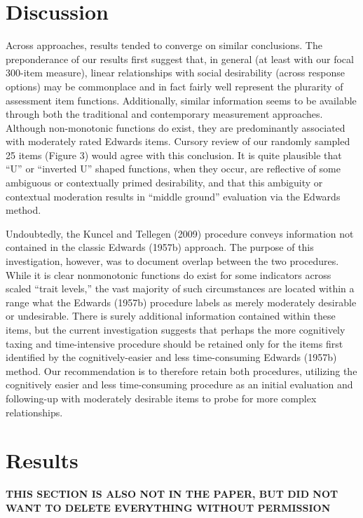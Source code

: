 \documentclass[
  english,
  ,jou]{apa6}
\begin{document}
\hypertarget{discussion}{%
\section{Discussion}\label{discussion}}

Across approaches, results tended to converge on similar conclusions. The preponderance of our results first suggest that, in general (at least with our focal 300-item measure), linear relationships with social desirability (across response options) may be commonplace and in fact fairly well represent the plurarity of assessment item functions. Additionally, similar information seems to be available through both the traditional and contemporary measurement approaches. Although non-monotonic functions do exist, they are predominantly associated with moderately rated Edwards items. Cursory review of our randomly sampled 25 items (Figure 3) would agree with this conclusion. It is quite plausible that ``U'' or ``inverted U'' shaped functions, when they occur, are reflective of some ambiguous or contextually primed desirability, and that this ambiguity or contextual moderation results in ``middle ground'' evaluation via the Edwards method.

Undoubtedly, the Kuncel and Tellegen (2009) procedure conveys information not contained in the classic Edwards (1957b) approach. The purpose of this investigation, however, was to document overlap between the two procedures. While it is clear nonmonotonic functions do exist for some indicators across scaled ``trait levels,'' the vast majority of such circumstances are located within a range what the Edwards (1957b) procedure labels as merely moderately desirable or undesirable. There is surely additional information contained within these items, but the current investigation suggests that perhaps the more cognitively taxing and time-intensive procedure should be retained only for the items first identified by the cognitively-easier and less time-consuming Edwards (1957b) method. Our recommendation is to therefore retain both procedures, utilizing the cognitively easier and less time-consuming procedure as an initial evaluation and following-up with moderately desirable items to probe for more complex relationships.

\hypertarget{results-1}{%
\section{Results}\label{results-1}}

\textbf{THIS SECTION IS ALSO NOT IN THE PAPER, BUT DID NOT WANT TO DELETE EVERYTHING WITHOUT PERMISSION}
\end{document}
